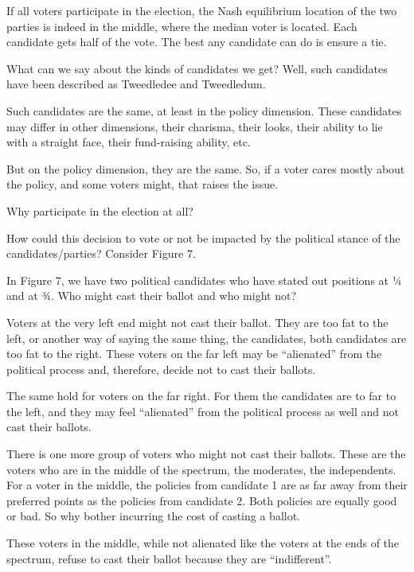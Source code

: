 \documentclass[
]{book}
\begin{document}
If all voters participate in the election, the Nash equilibrium location of the two parties is indeed in the middle, where the median voter is located. Each candidate gets half of the vote. The best any candidate can do is ensure a tie.

What can we say about the kinds of candidates we get? Well, such candidates have been described as
Tweedledee
and
Tweedledum.

Such candidates are the same, at least in the policy dimension. These candidates may differ in other dimensions, their charisma, their looks, their ability to lie with a straight face, their fund-raising ability, etc.

But on the policy dimension, they are the same. So, if a voter cares mostly about the policy, and some voters might, that raises the issue.

Why participate in the election at all?

How could this decision to vote or not be impacted by the political stance of the candidates/parties?
Consider Figure 7.

In Figure 7, we have two political candidates who have stated out positions at ¼ and at ¾. Who might cast their ballot and who might not?

Voters at the very left end might not cast their ballot. They are too fat to the left, or another way of saying the same thing, the candidates, both candidates are too fat to the right. These voters on the far left may be ``alienated'' from the political process and, therefore, decide not to cast their ballots.

The same hold for voters on the far right. For them the candidates are to far to the left, and they may feel ``alienated'' from the political process as well and not cast their ballots.

There is one more group of voters who might not cast their ballots. These are the voters who are in the middle of the spectrum, the moderates, the independents. For a voter in the middle, the policies from candidate 1 are as far away from their preferred points as the policies from candidate 2. Both policies are equally good or bad. So why bother incurring the cost of casting a ballot.

These voters in the middle, while not alienated like the voters at the ends of the spectrum, refuse to cast their ballot because they are ``indifferent''.
\end{document}
